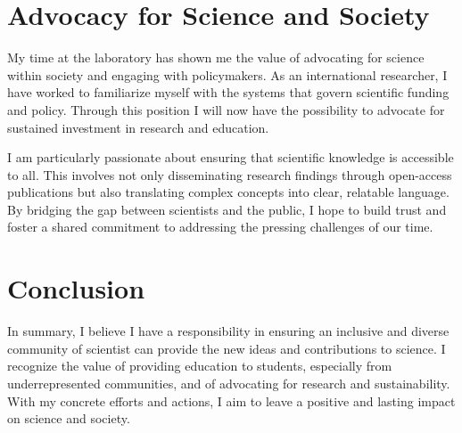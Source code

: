 {\begin{flushleft}

\vspace{\baselineskip}
\section{Advocacy for Science and Society}
\vspace{\baselineskip}

My time at the laboratory has shown me the value of advocating for science within society and engaging with policymakers. As an international researcher, I have worked to familiarize myself with the systems that govern scientific funding and policy. Through this position I  will now have the possibility to advocate for sustained investment in research and education.

I am particularly passionate about ensuring that scientific knowledge is accessible to all. This involves not only disseminating research findings through open-access publications but also translating complex concepts into clear, relatable language. By bridging the gap between scientists and the public, I hope to build trust and foster a shared commitment to addressing the pressing challenges of our time.

\vspace{\baselineskip}
\section{Conclusion}
\vspace{\baselineskip}
In summary, I believe I have a responsibility in ensuring an inclusive and diverse community of scientist can provide the new ideas and contributions to science. I recognize the value of providing education to students, especially from underrepresented communities, and of advocating for research and sustainability. With my concrete efforts and actions,  I aim to leave a positive and lasting impact on science and society.

\end{flushleft}
}
